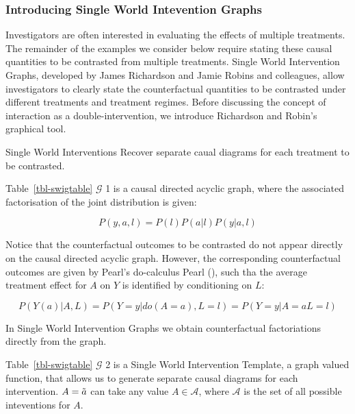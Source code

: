 \documentclass[
  single column]{article}
\begin{document}
\subsubsection{Introducing Single World Intevention
Graphs}\label{introducing-single-world-intevention-graphs}

Investigators are often interested in evaluating the effects of multiple
treatments. The remainder of the examples we consider below require
stating these causal quantities to be contrasted from multiple
treatments. Single World Intervention Graphs, developed by James
Richardson and Jamie Robins and colleagues, allow investigators to
clearly state the counterfactual quantities to be contrasted under
different treatments and treatment regimes. Before discussing the
concept of interaction as a double-intervention, we introduce Richardson
and Robin's graphical tool.

\begin{table}

\caption{\label{tbl-swigtable}Single World Interventions Recover
separate caual diagrams for each treatment to be contrasted.}

\centering{

\swigtable

}

\end{table}%

Table~\ref{tbl-swigtable} \(\mathcal{G}\) 1 is a causal directed acyclic
graph, where the associated factorisation of the joint distribution is
given:

\[
P(y, a, l) = P(l) P(a | l) P(y | a, l)
\]

Notice that the counterfactual outcomes to be contrasted do not appear
directly on the causal directed acyclic graph. However, the
corresponding counterfactual outcomes are given by Pearl's do-calculus
Pearl (), such tha the average treatment
effect for \(A\) on \(Y\) is identified by conditioning on \(L\):

\[
P(Y(a)|A,L) = P(Y = y|do(A =a), L=l) = P(Y=y|A=a L=l)
\]

In Single World Intervention Graphs we obtain counterfactual
factoriations directly from the graph.

Table~\ref{tbl-swigtable} \(\mathcal{G}\) 2 is a Single World
Intervention Template, a graph valued function, that allows us to
generate separate causal diagrams for each intervention.
\(A = \Tilde{a}\) can take any value \(A \in \mathcal{A}\), where
\(\mathcal{A}\) is the set of all possible inteventions for \(A\).
\end{document}
